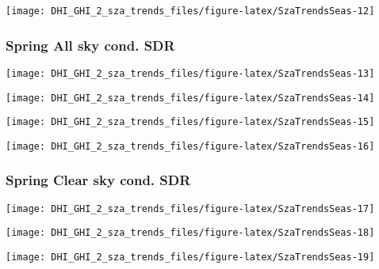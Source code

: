 \documentclass[
  10pt,
  a4paper,oneside]{article}
\begin{document}
\begin{center}\texttt{[image: DHI\_GHI\_2\_sza\_trends\_files/figure-latex/SzaTrendsSeas-12]} \end{center}

\newpage

\hypertarget{spring-all-sky-cond.-sdr}{%
\subsubsection{Spring All sky cond. SDR}\label{spring-all-sky-cond.-sdr}}

\begin{center}\texttt{[image: DHI\_GHI\_2\_sza\_trends\_files/figure-latex/SzaTrendsSeas-13]} \end{center}

\begin{center}\texttt{[image: DHI\_GHI\_2\_sza\_trends\_files/figure-latex/SzaTrendsSeas-14]} \end{center}

\begin{center}\texttt{[image: DHI\_GHI\_2\_sza\_trends\_files/figure-latex/SzaTrendsSeas-15]} \end{center}

\begin{center}\texttt{[image: DHI\_GHI\_2\_sza\_trends\_files/figure-latex/SzaTrendsSeas-16]} \end{center}

\newpage

\hypertarget{spring-clear-sky-cond.-sdr}{%
\subsubsection{Spring Clear sky cond. SDR}\label{spring-clear-sky-cond.-sdr}}

\begin{center}\texttt{[image: DHI\_GHI\_2\_sza\_trends\_files/figure-latex/SzaTrendsSeas-17]} \end{center}

\begin{center}\texttt{[image: DHI\_GHI\_2\_sza\_trends\_files/figure-latex/SzaTrendsSeas-18]} \end{center}

\begin{center}\texttt{[image: DHI\_GHI\_2\_sza\_trends\_files/figure-latex/SzaTrendsSeas-19]} \end{center}
\end{document}
